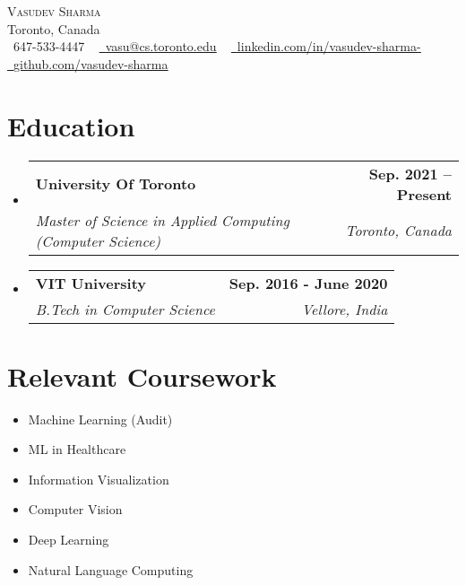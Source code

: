\documentclass[letterpaper,11pt]{article}
\makeatletter
\newcommand{\resumeSubheading}[4]{
  \vspace{-2pt}\item
    \begin{tabular*}{1.0\textwidth}[t]{l@{\extracolsep{\fill}}r}
      \textbf{#1} & \textbf{\small #2} \\
      \textit{\small#3} & \textit{\small #4} \\
    \end{tabular*}\vspace{-7pt}
}
\newcommand{\resumeSubHeadingListStart}{\begin{itemize}[leftmargin=0.0in, label={}]}
\newcommand{\resumeSubHeadingListEnd}{\end{itemize}}
\makeatother
\begin{document}
\begin{center}
    {\Huge \scshape Vasudev Sharma} \\ \vspace{1pt}
    Toronto, Canada \\ \vspace{1pt}
    \small \raisebox{-0.1\height}\faPhone\ 647-533-4447 ~ \href{mailto:vasu@cs.toronto.edu}{\raisebox{-0.2\height}\faEnvelope\  \underline{vasu@cs.toronto.edu}} ~ 
    \href{https://linkedin.com/in//}{\raisebox{-0.2\height}\faLinkedin\ \underline{linkedin.com/in/vasudev-sharma-}}  ~
    \href{https://github.com/}{\raisebox{-0.2\height}\faGithub\ \underline{github.com/vasudev-sharma}}
    \vspace{-8pt}
\end{center}

\begin{comment}
    \section{Summary}
    An open source contributor with one 1-year experience as a Machine Learning Engineer
\end{comment}
\section{Education}
  \resumeSubHeadingListStart
    \resumeSubheading
      {University Of Toronto}{Sep. 2021 -- Present}
      {Master of Science in Applied Computing (Computer Science)}{Toronto, Canada}
    \resumeSubheading
        {VIT University}{Sep. 2016 - June 2020}
        {B.Tech in Computer Science}{Vellore, India}
  \resumeSubHeadingListEnd

\section{Relevant Coursework}
        \begin{multicols}{4}
            \begin{itemize}[itemsep=-10pt, parsep=15pt]
                \item\small Machine Learning (Audit)
                \item\small ML in Healthcare
                \item Information Visualization
                \item Computer Vision 
                \item Deep Learning
                \item \small Natural Language Computing
            \end{itemize}
        \end{multicols}
        \vspace*{1.0\multicolsep}
\end{document}
